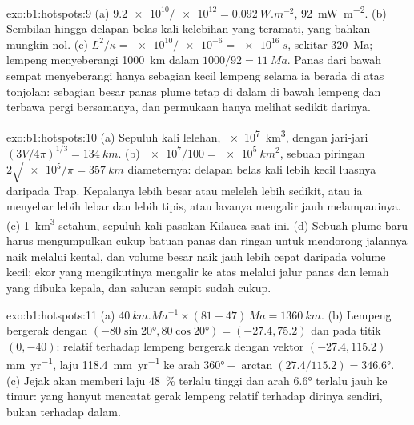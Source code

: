 \begin{solution}{exo:b1:hotspots:9}
(a) $\num{9.2e10}/\num{e12} = \qty{0.092}{W.m^{-2}}$, \qty{92}{mW.m^{-2}}.
(b) Sembilan hingga delapan belas kali kelebihan yang teramati, yang bahkan mungkin nol.
(c) $L^2/\kappa =
\num{e10}/\num{e-6} = \qty{e16}{s}$, sekitar \qty{320}{Ma}; lempeng menyeberangi
\qty{1000}{km} dalam $1000/92 = \qty{11}{Ma}$. Panas dari bawah sempat
menyeberangi hanya sebagian kecil lempeng selama ia berada di atas tonjolan: sebagian besar
panas plume tetap di dalam  di bawah lempeng dan terbawa pergi bersamanya, dan permukaan hanya melihat sedikit darinya.
\end{solution}

\begin{solution}{exo:b1:hotspots:10}
(a) Sepuluh kali lelehan, \qty{e7}{km^3}, dengan jari-jari
$(3V/4\pi)^{1/3} = \qty{134}{km}$. (b) $\num{e7}/100 = \qty{e5}{km^2}$, sebuah piringan
$2\sqrt{\num{e5}/\pi} = \qty{357}{km}$ diameternya: delapan belas kali lebih kecil luasnya
daripada Trap. Kepalanya lebih besar atau meleleh lebih sedikit, atau ia menyebar lebih lebar dan
lebih tipis, atau lavanya mengalir jauh melampauinya. (c) \qty{1}{km^3} setahun, sepuluh
kali pasokan Kilauea saat ini. (d) Sebuah plume baru harus mengumpulkan cukup
batuan panas dan ringan untuk mendorong jalannya naik melalui  kental, dan volume besar
naik jauh lebih cepat daripada volume kecil; ekor yang mengikutinya mengalir ke atas melalui
jalur panas dan lemah yang dibuka kepala, dan saluran sempit sudah cukup.
\end{solution}

\begin{solution}{exo:b1:hotspots:11}
(a) $\qty{40}{km.Ma^{-1}}\times(81 - 47)\,\unit{Ma} = \qty{1360}{km}$.
(b) Lempeng bergerak dengan $(-80\sin\ang{20}, 80\cos\ang{20}) = (-27.4, 75.2)$
dan  pada titik $(0, -40)$: relatif terhadap  lempeng bergerak dengan vektor
$(-27.4, 115.2)$ \unit{mm.yr^{-1}}, laju \qty{118.4}{mm.yr^{-1}} ke arah
$\ang{360} - \arctan(27.4/115.2) = \ang{346.6}$. (c) Jejak akan memberi
laju \qty{48}{\percent} terlalu tinggi dan arah \ang{6.6} terlalu jauh ke timur:
 yang hanyut mencatat gerak lempeng relatif terhadap dirinya sendiri, bukan terhadap
 dalam.
\end{solution}

